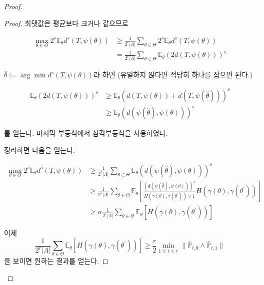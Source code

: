 \begin{proof}
\begin{lemma}
\begin{proof}
최댓값은 평균보다 크거나 같으므로 

\begin{equation*}
\begin{aligned}
\max_{\theta \in \Theta} 2^s \mathbb{E}_\theta d^s(T, \psi(\theta)) 
&\geq \frac{1}{2^r |\Lambda| } \sum _ {\theta \in \Theta} 2^s \mathbb{E} _ \theta d^s(T, \psi(\theta)) \\
&= \frac{1}{2^r |\Lambda| } \sum _ {\theta \in \Theta} \mathbb{E} _ \theta (2 d(T, \psi(\theta)))^s
\end{aligned}
\end{equation*}

$\hat{\theta} := \arg\min d^s(T, \psi(\theta))$라 하면 (유일하지 않다면 적당히 하나를 잡으면 된다.)

\begin{equation*}
\begin{aligned}
\mathbb{E} _ \theta (2 d(T, \psi(\theta)))^s
&\geq \mathbb{E} _ \theta (d(T, \psi(\theta)) + d(T, \psi(\hat{\theta})) )^s \\
&\geq \mathbb{E} _ \theta (d(\psi(\hat{\theta}), \psi(\theta)))^s
\end{aligned}
\end{equation*}

를 얻는다. 마지막 부등식에서 삼각부등식을 사용하였다. 

정리하면 다음을 얻는다. 

\begin{equation*}
\begin{aligned}
\max_{\theta \in \Theta} 2^s \mathbb{E}_\theta d^s(T, \psi(\theta)) 
&\geq \frac{1}{2^r |\Lambda| } \sum _ {\theta \in \Theta}  \mathbb{E} _ \theta (d(\psi(\hat{\theta}), \psi(\theta)))^s \\
&\geq \frac{1}{2^r |\Lambda| } \sum _ {\theta \in \Theta} \mathbb{E} _ \theta \left[\frac{(d(\psi(\hat{\theta}), \psi(\theta)))^s}{H(\gamma(\theta), \gamma(\theta^\prime)) \vee 1 } H(\gamma(\theta), \gamma(\theta^\prime))\right] \\
&\geq \alpha \frac{1}{2^r |\Lambda| } \sum _ {\theta \in \Theta} \mathbb{E} _ \theta \left[  H(\gamma(\theta), \gamma(\theta^\prime))\right]
\end{aligned}
\end{equation*}

이제 
\begin{equation*}
\frac{1}{2^r |\Lambda| } \sum _ {\theta \in \Theta} \mathbb{E} _ \theta \left[  H(\gamma(\theta), \gamma(\theta^\prime))\right] \geq \frac{r}{2} \min _ {1 \leq i \leq r} \lVert \overline{\mathbb{P}} _ {i, 0} \wedge \overline{\mathbb{P}} _ {i, 1} \rVert
\end{equation*}
을 보이면 원하는 결과를 얻는다. 


\end{proof}
\end{lemma}
\end{proof}
